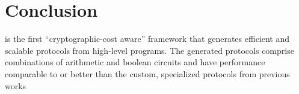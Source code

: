 \section{Conclusion}
\label{sec:conclude}
\tool is the first
``cryptographic-cost aware'' framework that generates efficient and
scalable \mpc protocols from high-level programs.
The generated protocols comprise combinations
of arithmetic and boolean circuits and have performance comparable to
or better than the custom, specialized
protocols from previous works